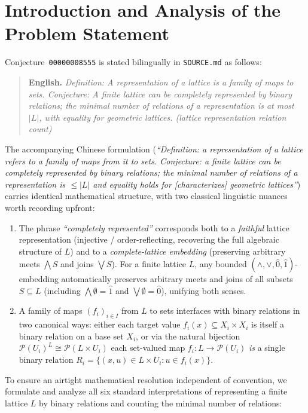 \documentclass[11pt]{article}
\theoremstyle{definition}
\theoremstyle{remark}
\newcommand{\Pow}{\mathcal{P}}
\begin{document}
\section{Introduction and Analysis of the Problem Statement}

Conjecture~\texttt{00000008555} is stated bilingually in \texttt{SOURCE.md} as follows:
\begin{quote}
\textbf{English.} \emph{Definition: A representation of a lattice is a family of maps to sets. Conjecture: A finite lattice can be completely represented by binary relations; the minimal number of relations of a representation is at most $|L|$, with equality for geometric lattices. (lattice representation relation count)}
\end{quote}
The accompanying Chinese formulation (\emph{``Definition: a representation of a lattice refers to a family of maps from it to sets. Conjecture: a finite lattice can be completely represented by binary relations; the minimal number of relations of a representation is $\le |L|$ and equality holds for [characterizes] geometric lattices''}) carries identical mathematical structure, with two classical linguistic nuances worth recording upfront:
\begin{enumerate}
\item[(a)] The phrase \emph{``completely represented''} corresponds both to a \emph{faithful} lattice representation (injective / order-reflecting, recovering the full algebraic structure of $L$) and to a \emph{complete-lattice embedding} (preserving arbitrary meets $\bigwedge S$ and joins $\bigvee S$). For a finite lattice $L$, any bounded $(\wedge,\vee,\hat{0},\hat{1})$-embedding automatically preserves arbitrary meets and joins of all subsets $S \subseteq L$ (including $\bigwedge \emptyset = \hat{1}$ and $\bigvee \emptyset = \hat{0}$), unifying both senses.
\item[(b)] A family of maps $(f_i)_{i \in I}$ from $L$ to sets interfaces with binary relations in two canonical ways: either each target value $f_i(x) \subseteq X_i \times X_i$ is itself a binary relation on a base set $X_i$, or via the natural bijection $\Pow(U_i)^L \cong \Pow(L \times U_i)$ each set-valued map $f_i \colon L \to \Pow(U_i)$ \emph{is} a single binary relation $R_i = \{(x,u) \in L \times U_i : u \in f_i(x)\}$.
\end{enumerate}

To ensure an airtight mathematical resolution independent of convention, we formulate and analyze all six standard interpretations of representing a finite lattice $L$ by binary relations and counting the minimal number of relations:
\end{document}
